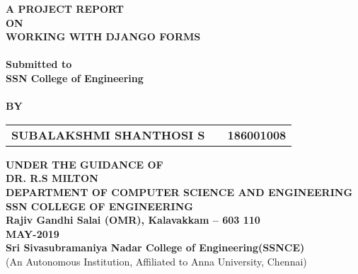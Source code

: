 \newpage
\begin{center}
\thispagestyle{empty}

\Large{\textbf{A PROJECT REPORT\\ \large{ON}}}\\[0.7cm]
\LARGE{\textsc {\textbf{WORKING WITH DJANGO FORMS}}}\\[0.5cm]
\vspace{0.5cm}
\Large{\textbf{\\Submitted to}}
\LARGE{\textbf{\\SSN College of Engineering\\}}
\vspace{1cm}
\Large{\textbf{\\BY}}\\[0.5cm]
\begin{table}[h]
\centering
\Large{
\begin{tabular}{>{\bfseries}lc>{\bfseries}r}
SUBALAKSHMI SHANTHOSI S & & 186001008 \\
\end{tabular}}
\end{table}
\vspace{0.5cm}
\large{\textbf{UNDER THE GUIDANCE OF}}\\
\large{\textbf{DR. R.S MILTON}}\\
\vspace{1cm}
\large{\textbf{DEPARTMENT OF COMPUTER SCIENCE AND ENGINEERING}}\\
\Large{\textbf{SSN COLLEGE OF ENGINEERING}}\\
\vspace{0.5cm}
\large{\textbf{Rajiv Gandhi Salai (OMR), Kalavakkam – 603 110 }}
\large{\textbf{\\MAY-2019}}\\
\vspace{1cm}
\Large{\textbf{Sri Sivasubramaniya Nadar College of Engineering(SSNCE)\\}}
(An Autonomous Institution, Affiliated to Anna University, Chennai)\\
\newpage
\end{center}
